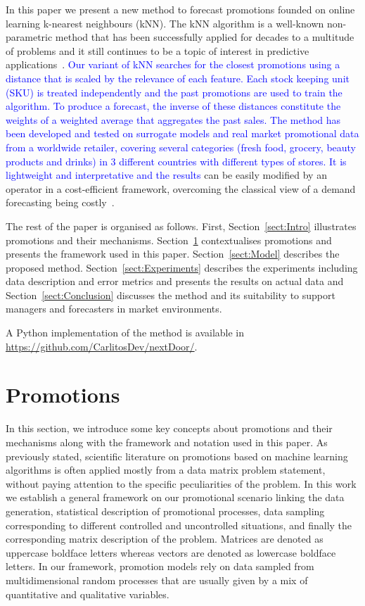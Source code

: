 \documentclass{ieeeaccess}
\newcommand{\myblue}[1]{\textcolor{blue}{#1}}
\begin{document}
In this paper we present a new method to forecast promotions founded on online learning k-nearest neighbours (kNN). The kNN algorithm is a well-known non-parametric method that has been successfully applied for decades to a multitude of problems and it still continues to be a topic of interest in predictive applications~\cite{LIU2011fast,CHEN2017feature,martinez2018dealing}. \myblue{Our variant of kNN searches for the closest promotions using a distance that is scaled by the relevance of each feature. Each stock keeping unit (SKU) is treated independently and the past promotions are used to train the algorithm. To produce a forecast, the inverse of these distances constitute the weights of a weighted average that aggregates the past sales. The method has been developed and tested on surrogate models and real market promotional data from a worldwide retailer, covering several categories (fresh food, grocery, beauty products and drinks) in 3 different countries with different types of stores. It is lightweight and interpretative and the results} can be easily modified by an operator in a cost-efficient framework, overcoming the classical view of a demand forecasting being costly~\cite{shin2010firms}.

The rest of the paper is organised as follows. First, Section~\ref{sect:Intro} illustrates promotions and their mechanisms. Section~\ref{sect:Promotions} contextualises promotions and presents the framework used in this paper. Section~\ref{sect:Model} describes the proposed method. Section~\ref{sect:Experiments} describes the experiments including data description and error metrics and presents the results on actual data and Section~\ref{sect:Conclusion} discusses the method and its suitability to support managers and forecasters in market environments.

A Python implementation of the method is available in \url{https://github.com/CarlitosDev/nextDoor/}.


\section{Promotions} \label{sect:Promotions}

In this section, we introduce some key concepts about promotions and their mechanisms along with the framework and notation used in this paper. As previously stated, scientific literature on promotions based on machine learning algorithms is often applied mostly from a data matrix problem statement, without paying attention to the specific peculiarities of the problem. In this work we establish a general framework on our promotional scenario linking the data generation, statistical description of promotional processes, data sampling corresponding to different controlled and uncontrolled situations, and finally the corresponding matrix description of the problem.
Matrices are denoted as uppercase boldface letters whereas vectors are denoted as lowercase boldface letters. In our framework, promotion models rely on data sampled from multidimensional random processes that are usually given by a mix of quantitative and qualitative variables.
\end{document}
